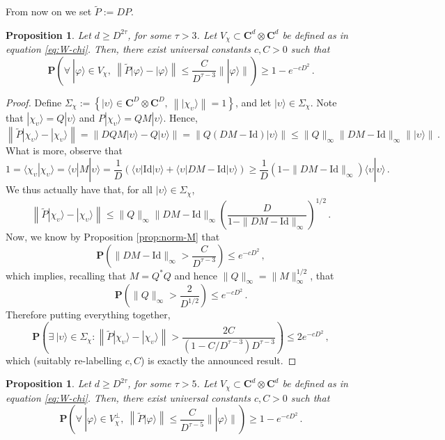 \documentclass{amsart}
\newtheorem{proposition}[theorem]{Proposition}
\newcommand{\C}{\mathbf{C}}
\renewcommand{\P}{\mathbf{P}}
\renewcommand{\leq}{\leqslant}
\renewcommand{\geq}{\geqslant}
\newcommand{\Id}{\mathrm{Id}}
\newcommand{\braket}[2]{\langle #1 | #2\rangle}
\newcommand{\bra}[1]{\langle #1 |}
\newcommand{\ket}[1]{| #1 \rangle}
\begin{document}
From now on we set $\widetilde{P}:=DP$.

\begin{proposition} \label{prop:invariant}
    Let $d\geq D^{2\tau}$, for some $\tau>3$. Let $V_{\chi}\subset{\C^d\otimes\C^d}$ be defined as in equation \eqref{eq:W-chi}. Then, there exist universal constants $c,C>0$ such that
    \[ \P\left( \forall\ \ket{\varphi}\in V_{\chi},\ \left\| \widetilde{P}\ket{\varphi} - \ket{\varphi} \right\| \leq \frac{C}{D^{\tau-3}} \|\ket{\varphi}\| \right) \geq 1-e^{-cD^2} \, . \]
\end{proposition}

\begin{proof}
    Define $\Sigma_{\chi}:=\left\{ \ket{\upsilon}\in\C^D\otimes\C^D,\ \left\| \ket{\chi_{\upsilon}} \right\|=1 \right\}$, and let $\ket{\upsilon}\in\Sigma_{\chi}$. Note that $\ket{\chi_{\upsilon}}=Q\ket{\upsilon}$ and $P\ket{\chi_{\upsilon}}=QM\ket{\upsilon}$. Hence,
    \[ \left\| \widetilde{P}\ket{\chi_{\upsilon}} - \ket{\chi_{\upsilon}} \right\| = \left\| DQM\ket{\upsilon} - Q\ket{\upsilon} \right\| = \left\| Q(DM-\Id)\ket{\upsilon} \right\| \leq \|Q\|_{\infty}\|DM-\Id\|_{\infty} \|\ket{\upsilon}\| \, . \]
    What is more, observe that
    \[ 1 = \braket{\chi_{\upsilon}}{\chi_{\upsilon}} = \bra{\upsilon} M \ket{\upsilon} = \frac{1}{D}\left( \bra{\upsilon} \Id \ket{\upsilon} + \bra{\upsilon} DM-\Id \ket{\upsilon} \right) \geq \frac{1}{D}(1-\|DM-\Id\|_{\infty}) \braket{\upsilon}{\upsilon} \, . \]
    We thus actually have that, for all $\ket{\upsilon}\in\Sigma_{\chi}$,
    \[ \left\| \widetilde{P}\ket{\chi_{\upsilon}} - \ket{\chi_{\upsilon}} \right\| \leq \|Q\|_{\infty}\|DM-\Id\|_{\infty} \left(\frac{D}{1-\|DM-\Id\|_{\infty}}\right)^{1/2} \, . \]
    Now, we know by Proposition \ref{prop:norm-M} that
    \[ \P\left( \|DM-\Id\|_{\infty} > \frac{C}{D^{\tau-3}} \right) \leq e^{-cD^2} \, , \]
    which implies, recalling that $M=Q^*Q$ and hence $\|Q\|_{\infty}=\|M\|_{\infty}^{1/2}$, that
    \[ \P\left( \|Q\|_{\infty} > \frac{2}{D^{1/2}} \right) \leq e^{-cD^2} \, . \]
    Therefore putting everything together,
    \[ \P\left( \exists\ \ket{\upsilon}\in\Sigma_{\chi}: \left\| \widetilde{P}\ket{\chi_{\upsilon}} - \ket{\chi_{\upsilon}} \right\|  > \frac{2C}{(1-C/D^{\tau-3})D^{\tau-3}} \right) \leq 2e^{-cD^2} \, ,	 \]
    which (suitably re-labelling $c,C$) is exactly the announced result.
\end{proof}

\begin{proposition} \label{prop:invariant'}
    Let $d\geq D^{2\tau}$, for some $\tau>5$. Let $V_{\chi}\subset{\C^d\otimes\C^d}$ be defined as in equation \eqref{eq:W-chi}. Then, there exist universal constants $c,C>0$ such that
    \[ \P\left( \forall\ \ket{\varphi}\in V_{\chi}^{\perp},\ \left\| \widetilde{P}\ket{\varphi}\right\| \leq \frac{C}{D^{\tau-5}} \|\ket{\varphi}\| \right) \geq 1-e^{-cD^2} \, . \]
\end{proposition}
\end{document}

